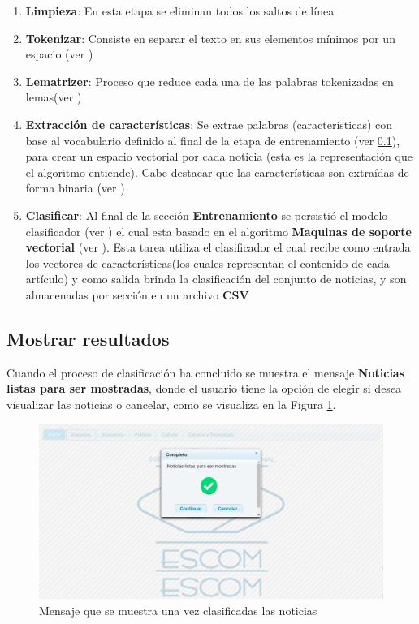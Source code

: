 \begin{enumerate}

	\item \textbf{Limpieza}: En esta etapa se eliminan todos los saltos de línea
	\item \textbf{Tokenizar}: Consiste en separar el texto en sus elementos mínimos por un espacio (ver )
	\item \textbf{Lematrizer}: Proceso que reduce cada una de las palabras tokenizadas en lemas(ver )
	\item \textbf{Extracción de características}: Se extrae palabras (características) con base al vocabulario definido al final de la etapa de entrenamiento (ver \ref{}), para crear un espacio vectorial por cada noticia (esta es la representación que el algoritmo entiende). Cabe destacar que las características son extraídas de forma binaria (ver )
	\item \textbf{Clasificar}: Al final de la sección \textbf{Entrenamiento} se persistió el modelo clasificador (ver ) el cual esta basado en el algoritmo \textbf{Maquinas de soporte vectorial} (ver ). Esta tarea utiliza el clasificador el cual recibe como entrada los vectores de características(los cuales representan el contenido de cada artículo) y como salida brinda la clasificación del conjunto de noticias, y son almacenadas por sección en un archivo \textbf{CSV}

\end{enumerate}


\subsection{Mostrar resultados}


Cuando el proceso de clasificación ha concluido se muestra el mensaje \textbf{Noticias listas para ser mostradas}, donde el usuario tiene la opción de elegir si desea visualizar las noticias o cancelar, como se visualiza en la Figura \ref{fig:notClass}.

\begin{figure}[H]
\centering
\includegraphics[scale=0.29]{imagenes/Capitulo5/noticiasListasParaSerMostradas.png}
\caption{Mensaje que se muestra una vez clasificadas las noticias}
\label{fig:notClass}
\end{figure}

